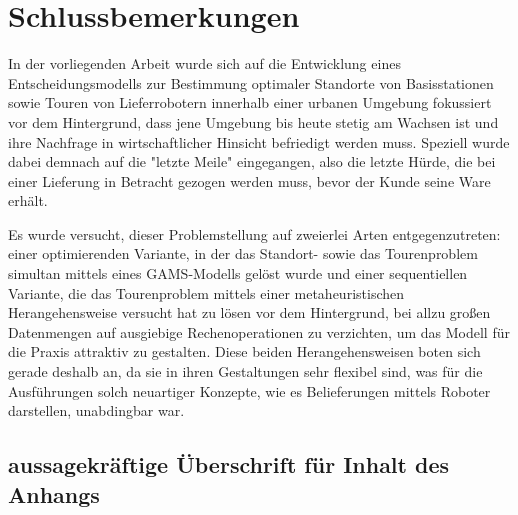 \documentclass[a4paper,12pt,parskip,bibtotoc,liststotoc]{article}
\begin{document}
\newpage
\section{Schlussbemerkungen}



In der vorliegenden Arbeit wurde sich auf die Entwicklung eines Entscheidungsmodells zur Bestimmung optimaler Standorte von Basisstationen sowie Touren von Lieferrobotern innerhalb einer urbanen Umgebung fokussiert vor dem Hintergrund, dass jene Umgebung bis heute stetig am Wachsen ist und ihre Nachfrage in wirtschaftlicher Hinsicht befriedigt werden muss.
Speziell wurde dabei demnach auf die "letzte Meile" eingegangen, also die letzte Hürde, die bei einer Lieferung in Betracht gezogen werden muss, bevor der Kunde seine Ware erhält.

Es wurde versucht, dieser Problemstellung auf zweierlei Arten entgegenzutreten: einer optimierenden Variante, in der das Standort- sowie das Tourenproblem simultan mittels eines GAMS-Modells gelöst wurde und einer sequentiellen Variante, die das Tourenproblem mittels einer metaheuristischen Herangehensweise versucht hat zu lösen vor dem Hintergrund, bei allzu großen Datenmengen auf ausgiebige Rechenoperationen zu verzichten, um das Modell für die Praxis attraktiv zu gestalten.
Diese beiden Herangehensweisen boten sich gerade deshalb an, da sie in ihren Gestaltungen sehr flexibel sind, was für die Ausführungen solch neuartiger Konzepte, wie es Belieferungen mittels Roboter darstellen, unabdingbar war.














\newpage

\newpage

\begin{appendix}
\section{aussagekräftige Überschrift für Inhalt des Anhangs}

\end{appendix}
%
%
\end{document}
